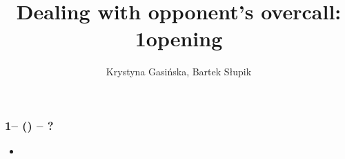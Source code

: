 \documentclass[12pt, a4paper]{article}
\title{Dealing with opponent's overcall: 1\diams opening}
\author{Krystyna Gasińska, Bartek Słupik}
\begin{document}
\maketitle


\subsubsection*{1\diams -- (\dbl) -- ?}
\begin{itemize}
    \item 
\end{itemize}

\end{document}
